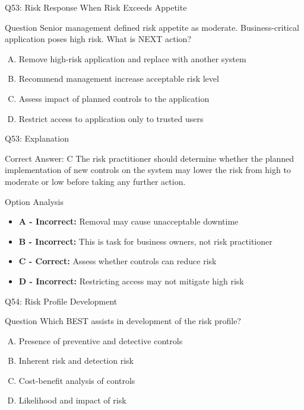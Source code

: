 \documentclass{beamer}
\begin{document}
	\begin{frame}{Q53: Risk Response When Risk Exceeds Appetite}
		\begin{block}{Question}
			Senior management defined risk appetite as moderate. Business-critical application poses high risk. What is NEXT action?
		\end{block}
		\begin{enumerate}[(A)]
			\item Remove high-risk application and replace with another system
			\item Recommend management increase acceptable risk level
			\item Assess impact of planned controls to the application
			\item Restrict access to application only to trusted users
		\end{enumerate}
	\end{frame}
	
	\begin{frame}{Q53: Explanation}
		\begin{block}{Correct Answer: C}
			The risk practitioner should determine whether the planned implementation of new controls on the system may lower the risk from high to moderate or low before taking any further action.
		\end{block}
		\begin{block}{Option Analysis}
			\begin{itemize}
				\item \textbf{A - Incorrect:} Removal may cause unacceptable downtime
				\item \textbf{B - Incorrect:} This is task for business owners, not risk practitioner
				\item \textbf{C - Correct:} Assess whether controls can reduce risk
				\item \textbf{D - Incorrect:} Restricting access may not mitigate high risk
			\end{itemize}
		\end{block}
	\end{frame}
	
	\begin{frame}{Q54: Risk Profile Development}
		\begin{block}{Question}
			Which BEST assists in development of the risk profile?
		\end{block}
		\begin{enumerate}[(A)]
			\item Presence of preventive and detective controls
			\item Inherent risk and detection risk
			\item Cost-benefit analysis of controls
			\item Likelihood and impact of risk
		\end{enumerate}
	\end{frame}
	
\end{document}
